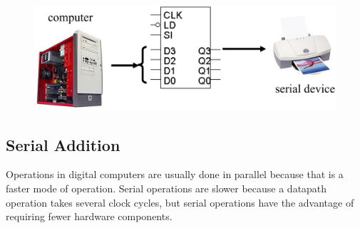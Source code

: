 \begin{figure}[H]
  \centering
  \includegraphics[width=\linewidth]{img/sending-data-serially.png}
\end{figure}


\subsection{Serial Addition}
\label{subsec:serial-addition}

Operations in digital computers are usually done in parallel because that is a faster mode of operation. Serial operations are slower because a datapath operation takes several clock cycles, but serial operations have the advantage of requiring fewer hardware components.

